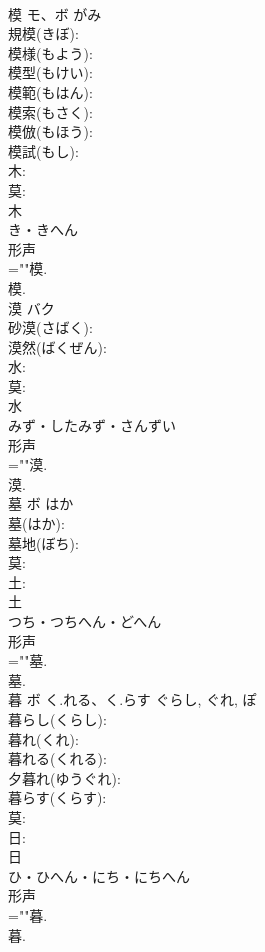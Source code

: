 \documentclass[8pt]{extreport}
\begin{document}
\begin{CJK}{UTF8}{min}
\\	模	モ、ボ		がみ	
\\	規模(きぼ): 
\\	模様(もよう): 
\\	模型(もけい): 
\\	模範(もはん): 
\\	模索(もさく): 
\\	模倣(もほう): 
\\	模試(もし): 
\\	木: 
\\	莫: 
\\	木	
\\	き・きへん	
\\	形声 
\\	=""模.
\\	模.
\\	漠	バク			
\\	砂漠(さばく): 
\\	漠然(ばくぜん): 
\\	水: 
\\	莫: 
\\	水	
\\	みず・したみず・さんずい	
\\	形声 
\\	=""漠.
\\	漠.
\\	墓	ボ	はか		
\\	墓(はか): 
\\	墓地(ぼち): 
\\	莫: 
\\	土: 
\\	土	
\\	つち・つちへん・どへん	
\\	形声 
\\	=""墓.
\\	墓.
\\	暮	ボ	く.れる、く.らす	ぐらし, ぐれ, ぽ	
\\	暮らし(くらし): 
\\	暮れ(くれ): 
\\	暮れる(くれる): 
\\	夕暮れ(ゆうぐれ): 
\\	暮らす(くらす): 
\\	莫: 
\\	日: 
\\	日	
\\	ひ・ひへん・にち・にちへん	
\\	形声 
\\	=""暮.
\\	暮.

\end{CJK}
\end{document}
